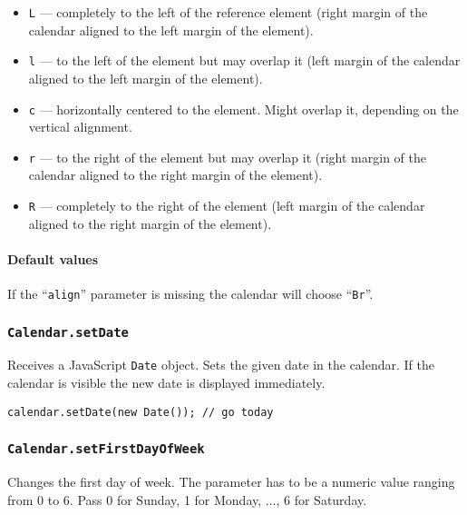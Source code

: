 \documentclass[a4paper,10pt]{article}
\begin{document}
\begin{itemize}

\item \texttt{L} --- completely to the left of the reference element (right
margin of the calendar aligned to the left margin of the element).

\item \texttt{l} --- to the left of the element but may overlap it (left margin
of the calendar aligned to the left margin of the element).

\item \texttt{c} --- horizontally centered to the element.  Might overlap it,
depending on the vertical alignment.

\item \texttt{r} --- to the right of the element but may overlap it (right
margin of the calendar aligned to the right margin of the element).

\item \texttt{R} --- completely to the right of the element (left margin of the
calendar aligned to the right margin of the element).

\end{itemize}

\paragraph{Default values}
If the ``\texttt{align}'' parameter is missing the calendar will choose
``\texttt{Br}''.

\subsubsection{\texttt{Calendar.setDate}}\label{sec:Calendar.setDate}

Receives a JavaScript \texttt{Date} object.  Sets the given date in the
calendar.  If the calendar is visible the new date is displayed immediately.

\begin{verbatim}
calendar.setDate(new Date()); // go today
\end{verbatim}

\subsubsection{\texttt{Calendar.setFirstDayOfWeek}}\label{sec:Calendar.setFirstDayOfWeek}

Changes the first day of week.  The parameter has to be a numeric value ranging
from 0 to 6.  Pass 0 for Sunday, 1 for Monday, ..., 6 for Saturday.
\end{document}
